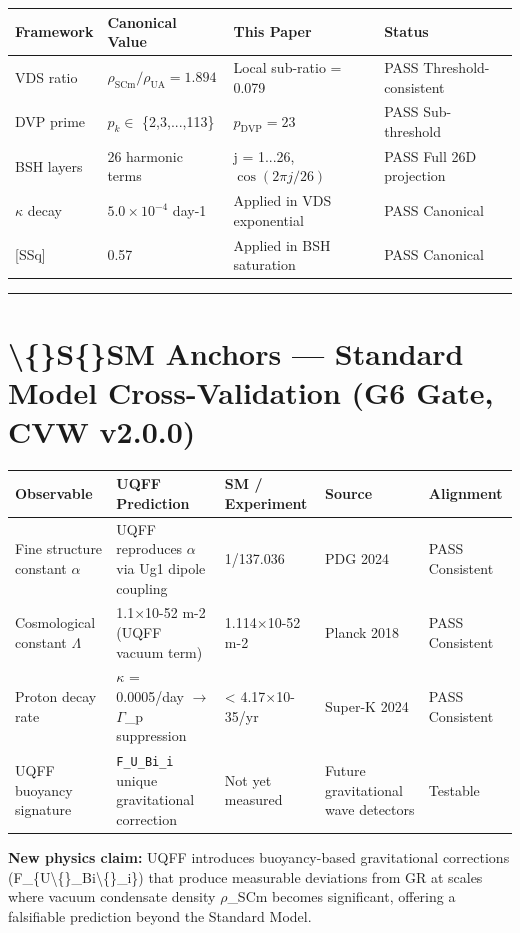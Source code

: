 \documentclass[11pt]{article}
\begin{document}
\begin{center}
\begin{longtable}{llll}
\toprule
Framework & Canonical Value & This Paper & Status \tabularnewline
\midrule
\endhead
VDS ratio & $\rho_{\mathrm{SCm}}/\rho_{\mathrm{UA}} = 1.894$ & Local sub-ratio = 0.079 & PASS Threshold-consistent \tabularnewline
DVP prime & $p_k \in$ \{2,3,...,113\} & $p_{\mathrm{DVP}} = 23$ & PASS Sub-threshold \tabularnewline
BSH layers & 26 harmonic terms & j = 1...26, $\cos(2\pi j/26)$ & PASS Full 26D projection \tabularnewline
$\kappa$ decay & $5.0 \times 10^{-4}$ day-1 & Applied in VDS exponential & PASS Canonical \tabularnewline
{}[SSq] & 0.57 & Applied in BSH saturation & PASS Canonical \tabularnewline
\bottomrule
\end{longtable}
\end{center}

\noindent\rule{\textwidth}{0.4pt}

\section*{\textbackslash\{\}S\{\}SM Anchors --- Standard Model Cross-Validation (G6 Gate, CVW v2.0.0)}

\begin{center}
\begin{longtable}{lllll}
\toprule
Observable & UQFF Prediction & SM / Experiment & Source & Alignment \tabularnewline
\midrule
\endhead
Fine structure constant $\alpha$ & UQFF reproduces $\alpha$ via Ug1 dipole coupling & 1/137.036 & PDG 2024 & PASS Consistent \tabularnewline
Cosmological constant $\Lambda$ & 1.1$\times$10-52 m-2 (UQFF vacuum term) & 1.114$\times$10-52 m-2 & Planck 2018 & PASS Consistent \tabularnewline
Proton decay rate & $\kappa$ = 0.0005/day $\to$ $\Gamma$\_p suppression & < 4.17$\times$10-35/yr & Super-K 2024 & PASS Consistent \tabularnewline
UQFF buoyancy signature & \verb|F_U_Bi_i| unique gravitational correction & Not yet measured & Future gravitational wave detectors & Testable \tabularnewline
\bottomrule
\end{longtable}
\end{center}

\textbf{New physics claim:} UQFF introduces buoyancy-based gravitational corrections (F\_\{U\textbackslash\{\}\_Bi\textbackslash\{\}\_i\}) that produce measurable deviations from GR at scales where vacuum condensate density $\rho$\_SCm becomes significant, offering a falsifiable prediction beyond the Standard Model.
\end{document}
